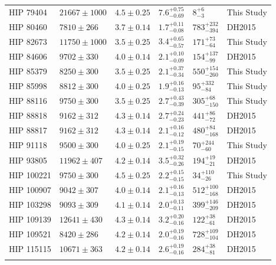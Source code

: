 \documentclass{emulateapj}
\begin{document}
\begin{longtable*}{|l|lllll|}
  HIP 79404 &  $21667 \pm 1000$ &  $4.5 \pm 0.25$ &  $7.6^{+0.75}_{-0.69}$ &        $8^{+6}_{-3}$ &  This Study \\
  HIP 80460 &    $7810 \pm 266$ &  $3.7 \pm 0.14$ &  $1.7^{+0.11}_{-0.08}$ &  $783^{+232}_{-394}$ &      DH2015 \\
  HIP 82673 &  $11750 \pm 1000$ &  $3.5 \pm 0.25$ &  $3.4^{+0.65}_{-0.57}$ &    $171^{+73}_{-64}$ &  This Study \\
  HIP 84606 &    $9702 \pm 330$ &  $4.0 \pm 0.14$ &  $2.1^{+0.10}_{-0.09}$ &   $154^{+137}_{-99}$ &      DH2015 \\
  HIP 85379 &    $8250 \pm 300$ &  $3.5 \pm 0.25$ &  $2.1^{+0.37}_{-0.34}$ &  $550^{+154}_{-260}$ &  This Study \\
  HIP 85998 &    $8812 \pm 300$ &  $4.0 \pm 0.25$ &  $1.9^{+0.16}_{-0.13}$ &    $95^{+332}_{-84}$ &  This Study \\
  HIP 88116 &    $9750 \pm 300$ &  $3.5 \pm 0.25$ &  $2.7^{+0.43}_{-0.39}$ &   $305^{+68}_{-150}$ &  This Study \\
  HIP 88818 &    $9162 \pm 312$ &  $4.3 \pm 0.14$ &  $2.7^{+0.24}_{-0.23}$ &    $441^{+86}_{-72}$ &      DH2015 \\
  HIP 88817 &    $9162 \pm 312$ &  $4.3 \pm 0.14$ &  $2.1^{+0.16}_{-0.12}$ &   $480^{+84}_{-168}$ &      DH2015 \\
  HIP 91118 &    $9500 \pm 300$ &  $4.0 \pm 0.25$ &  $2.1^{+0.19}_{-0.15}$ &    $70^{+244}_{-60}$ &  This Study \\
  HIP 93805 &   $11962 \pm 407$ &  $4.2 \pm 0.14$ &  $3.5^{+0.32}_{-0.26}$ &    $194^{+19}_{-21}$ &      DH2015 \\
 HIP 100221 &    $9750 \pm 300$ &  $4.5 \pm 0.25$ &  $2.2^{+0.15}_{-0.15}$ &    $34^{+110}_{-26}$ &  This Study \\
 HIP 100907 &    $9042 \pm 307$ &  $4.0 \pm 0.14$ &  $2.1^{+0.16}_{-0.13}$ &  $512^{+100}_{-168}$ &      DH2015 \\
 HIP 103298 &    $9093 \pm 309$ &  $4.1 \pm 0.14$ &  $2.0^{+0.13}_{-0.11}$ &  $399^{+146}_{-209}$ &      DH2015 \\
 HIP 109139 &   $12641 \pm 430$ &  $4.3 \pm 0.14$ &  $3.2^{+0.20}_{-0.16}$ &    $122^{+38}_{-61}$ &      DH2015 \\
 HIP 109521 &    $8420 \pm 286$ &  $4.2 \pm 0.14$ &  $2.0^{+0.19}_{-0.16}$ &  $728^{+109}_{-104}$ &      DH2015 \\
 HIP 115115 &   $10671 \pm 363$ &  $4.2 \pm 0.14$ &  $2.6^{+0.19}_{-0.16}$ &    $284^{+38}_{-81}$ &      DH2015 \\
\label{tab:primary}
\end{longtable*}






\newpage
\clearpage

\end{document}
